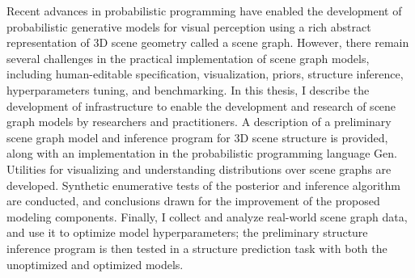 % 
% 
%
Recent advances in probabilistic programming have enabled the development of probabilistic generative models for visual perception using a rich abstract representation of 3D scene geometry called a scene graph.
However, there remain several challenges in the practical implementation of scene graph models, including human-editable specification, visualization, priors, structure inference, hyperparameters tuning, and benchmarking.
In this thesis, I describe the development of infrastructure to enable the development and research of scene graph models by researchers and practitioners.
A description of a preliminary scene graph model and inference program for 3D scene structure is provided, along with an implementation in the probabilistic programming language Gen.
Utilities for visualizing and understanding distributions over scene graphs are developed.
Synthetic enumerative tests of the posterior and inference algorithm are conducted, and conclusions drawn for the improvement of the proposed modeling components.
Finally, I collect and analyze real-world scene graph data, and use it to optimize model hyperparameters; the preliminary structure inference program is then tested in a structure prediction task with both the unoptimized and optimized models.
